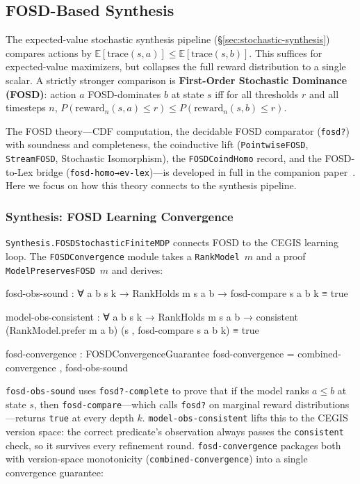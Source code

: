 \documentclass[9pt,a4paper]{article}
\theoremstyle{plain}
\theoremstyle{definition}
\theoremstyle{remark}
\begin{document}
\subsection{FOSD-Based Synthesis}
\label{sec:fosd-synth}

The expected-value stochastic synthesis pipeline (\S\ref{sec:stochastic-synthesis}) compares actions by $\mathbb{E}[\text{trace}(s, a)] \le \mathbb{E}[\text{trace}(s, b)]$.
This suffices for expected-value maximizers, but collapses the full reward distribution to a single scalar.
A strictly stronger comparison is \textbf{First-Order Stochastic Dominance (FOSD)}: action $a$ FOSD-dominates $b$ at state $s$ iff for all thresholds $r$ and all timesteps $n$, $P(\text{reward}_n(s,a) \le r) \le P(\text{reward}_n(s,b) \le r)$.

The FOSD theory---CDF computation, the decidable FOSD comparator (\texttt{fosd?}) with soundness and completeness, the coinductive lift (\texttt{PointwiseFOSD}, \texttt{StreamFOSD}, Stochastic Isomorphism), the \texttt{FOSDCoindHomo} record, and the FOSD-to-Lex bridge (\texttt{fosd-homo→ev-lex})---is developed in full in the companion paper~\cite{CSHRLSuccessor}.  Here we focus on how this theory connects to the synthesis pipeline.

\subsubsection{Synthesis: FOSD Learning Convergence}

\texttt{Synthesis.FOSDStochasticFiniteMDP} connects FOSD to the CEGIS learning loop.  The \texttt{FOSDConvergence} module takes a \texttt{RankModel}~$m$ and a proof \texttt{ModelPreservesFOSD}~$m$ and derives:

\begin{spec}
  fosd-obs-sound : ∀ a b s k →
    RankHolds m s a b →
    fosd-compare s a b k ≡ true

  model-obs-consistent : ∀ a b s k →
    RankHolds m s a b →
    consistent (RankModel.prefer m a b)
               (s , fosd-compare s a b k) ≡ true

  fosd-convergence : FOSDConvergenceGuarantee
  fosd-convergence = combined-convergence , fosd-obs-sound
\end{spec}

\noindent \texttt{fosd-obs-sound} uses \texttt{fosd?-complete} to prove that if the model ranks $a \le b$ at state $s$, then \texttt{fosd-compare}---which calls \texttt{fosd?} on marginal reward distributions---returns \texttt{true} at every depth $k$.  \texttt{model-obs-consistent} lifts this to the CEGIS version space: the correct predicate's observation always passes the \texttt{consistent} check, so it survives every refinement round.  \texttt{fosd-convergence} packages both with version-space monotonicity (\texttt{combined-convergence}) into a single convergence guarantee:
\end{document}
